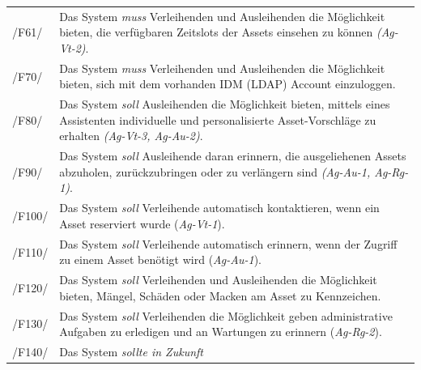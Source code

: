 \begin{center}
\begin{longtable}{lp{}}
                \\
                \sffamily\color{maincolor}/F61/  & Das System \textit{muss} Verleihenden und
                Ausleihenden die Möglichkeit bieten, die verfügbaren Zeitslots der Assets einsehen
                zu können \textit{(Ag-Vt-2)}.                                                           \\
                \sffamily\color{maincolor}/F70/  & Das System \textit{muss} Verleihenden und
                Ausleihenden die Möglichkeit bieten, sich mit dem vorhanden IDM (LDAP) Account
                einzuloggen.                                                                            \\
                \sffamily\color{maincolor}/F80/  & Das System \textit{soll} Ausleihenden die
                Möglichkeit bieten, mittels eines Assistenten individuelle und personalisierte
                Asset-Vorschläge zu erhalten \textit{(Ag-Vt-3, Ag-Au-2)}.                               \\
                \sffamily\color{maincolor}/F90/  & Das System \textit{soll} Ausleihende daran
                erinnern, die ausgeliehenen Assets abzuholen, zurückzubringen oder zu verlängern
                sind \textit{(Ag-Au-1, Ag-Rg-1)}.                                                       \\
                \sffamily\color{maincolor}/F100/ & Das System \textit{soll} Verleihende
                automatisch kontaktieren, wenn ein Asset reserviert wurde (\textit{Ag-Vt-1}).           \\
                \sffamily\color{maincolor}/F110/ & Das System \textit{soll} Verleihende
                automatisch erinnern, wenn der Zugriff zu einem Asset benötigt wird (\textit{Ag-Au-1}). \\
                \sffamily\color{maincolor}/F120/ & Das System \textit{soll} Verleihenden und
                Ausleihenden die Möglichkeit bieten, Mängel, Schäden oder Macken am Asset zu
                Kennzeichen.                                                                            \\
                \sffamily\color{maincolor}/F130/ & Das System \textit{soll} Verleihenden die
                Möglichkeit geben administrative Aufgaben zu erledigen und an Wartungen zu
                erinnern (\textit{Ag-Rg-2}).                                                            \\
                \sffamily\color{maincolor}/F140/ & Das System \textit{sollte in Zukunft}

\end{longtable}
\end{center}
